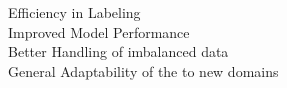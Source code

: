 \documentclass[preview]{standalone}
\begin{document}
Efficiency in Labeling\\Improved Model Performance\\Better Handling of imbalanced data\\General Adaptability of the \model to new domains\\
\end{document}
